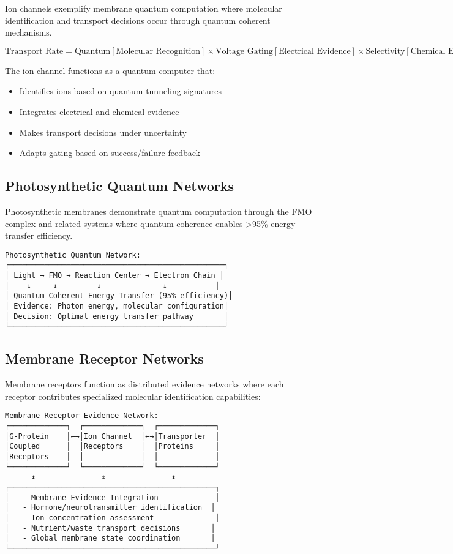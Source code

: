 \documentclass[12pt,a4paper]{article}
\begin{document}
Ion channels exemplify membrane quantum computation where molecular identification and transport decisions occur through quantum coherent mechanisms.

\begin{equation}
\text{Transport Rate} = \text{Quantum}[\text{Molecular Recognition}] \times \text{Voltage Gating}[\text{Electrical Evidence}] \times \text{Selectivity}[\text{Chemical Evidence}]
\end{equation}

The ion channel functions as a quantum computer that:
\begin{itemize}
\item Identifies ions based on quantum tunneling signatures
\item Integrates electrical and chemical evidence
\item Makes transport decisions under uncertainty
\item Adapts gating based on success/failure feedback
\end{itemize}

\subsection{Photosynthetic Quantum Networks}

Photosynthetic membranes demonstrate quantum computation through the FMO complex and related systems where quantum coherence enables >95\% energy transfer efficiency.

\begin{verbatim}
Photosynthetic Quantum Network:
┌─────────────────────────────────────────────────┐
│ Light → FMO → Reaction Center → Electron Chain │
│    ↓     ↓         ↓              ↓           │
│ Quantum Coherent Energy Transfer (95% efficiency)│
│ Evidence: Photon energy, molecular configuration│
│ Decision: Optimal energy transfer pathway       │
└─────────────────────────────────────────────────┘
\end{verbatim}

\subsection{Membrane Receptor Networks}

Membrane receptors function as distributed evidence networks where each receptor contributes specialized molecular identification capabilities:

\begin{verbatim}
Membrane Receptor Evidence Network:
┌─────────────┐  ┌─────────────┐  ┌─────────────┐
│G-Protein    │←→│Ion Channel  │←→│Transporter  │
│Coupled      │  │Receptors    │  │Proteins     │
│Receptors    │  │             │  │             │
└─────────────┘  └─────────────┘  └─────────────┘
      ↕               ↕               ↕
┌───────────────────────────────────────────────┐
│     Membrane Evidence Integration             │
│   - Hormone/neurotransmitter identification  │
│   - Ion concentration assessment              │
│   - Nutrient/waste transport decisions       │
│   - Global membrane state coordination       │
└───────────────────────────────────────────────┘
\end{verbatim}
\end{document}
